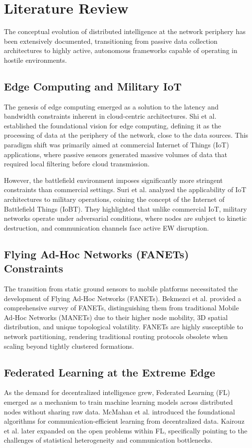 \documentclass[10pt]{article}
\begin{document}
\section{Literature Review}

The conceptual evolution of distributed intelligence at the network periphery has been extensively documented, transitioning from passive data collection architectures to highly active, autonomous frameworks capable of operating in hostile environments.

\subsection{Edge Computing and Military IoT}
The genesis of edge computing emerged as a solution to the latency and bandwidth constraints inherent in cloud-centric architectures. Shi et al. \cite{shi2016} established the foundational vision for edge computing, defining it as the processing of data at the periphery of the network, close to the data sources. This paradigm shift was primarily aimed at commercial Internet of Things (IoT) applications, where passive sensors generated massive volumes of data that required local filtering before cloud transmission. 

However, the battlefield environment imposes significantly more stringent constraints than commercial settings. Suri et al. \cite{suri2016} analyzed the applicability of IoT architectures to military operations, coining the concept of the Internet of Battlefield Things (IoBT). They highlighted that unlike commercial IoT, military networks operate under adversarial conditions, where nodes are subject to kinetic destruction, and communication channels face active EW disruption.

\subsection{Flying Ad-Hoc Networks (FANETs) Constraints}
The transition from static ground sensors to mobile platforms necessitated the development of Flying Ad-Hoc Networks (FANETs). Bekmezci et al. \cite{bekmezci2013} provided a comprehensive survey of FANETs, distinguishing them from traditional Mobile Ad-Hoc Networks (MANETs) due to their higher node mobility, 3D spatial distribution, and unique topological volatility. FANETs are highly susceptible to network partitioning, rendering traditional routing protocols obsolete when scaling beyond tightly clustered formations.

\subsection{Federated Learning at the Extreme Edge}
As the demand for decentralized intelligence grew, Federated Learning (FL) emerged as a mechanism to train machine learning models across distributed nodes without sharing raw data. McMahan et al. \cite{mcmahan2017} introduced the foundational algorithms for communication-efficient learning from decentralized data. Kairouz et al. \cite{kairouz2021} later expanded on the open problems within FL, specifically pointing to the challenges of statistical heterogeneity and communication bottlenecks. 
\end{document}
